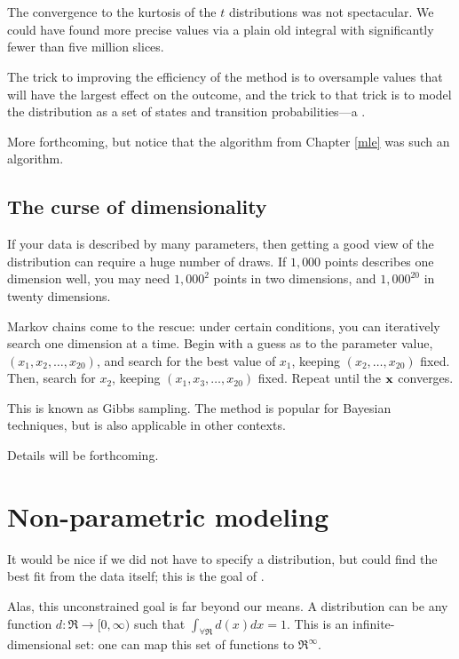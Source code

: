 \section{} 
The convergence to the kurtosis of the $t$ distributions was not
spectacular. We could have found more precise values via a plain old
integral with significantly fewer than five million slices. 

The trick to improving the efficiency of the method is to oversample
values that will have the largest effect on the outcome, and the trick
to that trick is to model the distribution as a set of states and
transition probabilities---a .

More forthcoming, but notice that the 
algorithm from Chapter \ref{mle} was such an algorithm.


\subsection{The curse of dimensionality}

If your data is described by
many parameters, then getting a good view of the distribution can require
a huge number of draws. If $1,000$ points describes one dimension well,
you may need $1,000^2$ points in two dimensions, and $1,000^{20}$ in
twenty dimensions. 

Markov chains come to the rescue: under certain conditions, you can
iteratively search one dimension at a time. Begin with a guess as to
the parameter value, $(x_1, x_2, \dots, x_{20})$, and search for the
best value of $x_1$, keeping
$(x_2, \dots, x_{20})$ fixed. Then, search for $x_2$, keeping
$(x_1, x_3,  \dots, x_{20})$ fixed. Repeat until the ${\bf x}$ converges.

This is known as Gibbs sampling.
The method is popular for Bayesian techniques, but is also applicable in
other contexts.

Details will be forthcoming.


\section{Non-parametric modeling}\label{nonparam} It would be nice if we did not
have to specify a distribution, but could find the best fit from the
data itself; this is the goal of . 

Alas, this unconstrained goal is far beyond our means.
A distribution can be any function $d:\Re \to [0,\infty)$ such that
$\int_{\forall \Re} d(x) dx = 1$. This is an infinite-dimensional set:
one can map this set of functions to $\Re^\infty$.

